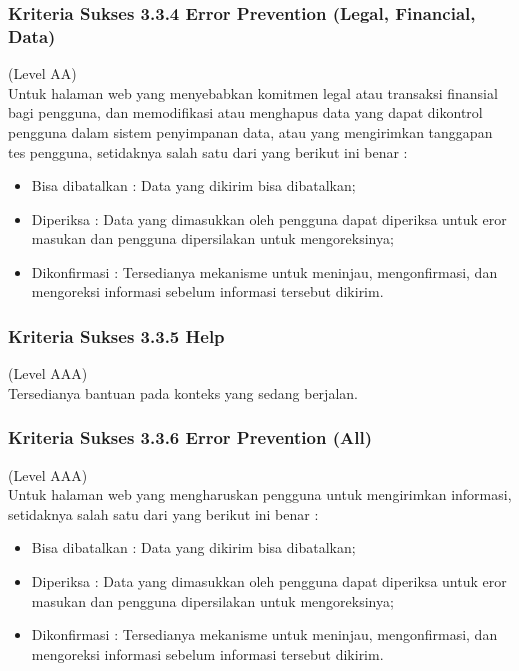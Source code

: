 \subsubsection{Kriteria Sukses 3.3.4 Error Prevention (Legal, Financial, Data)}
\label{subsubsec:kriteria_3.3.4}
(Level AA) \\

Untuk halaman web yang menyebabkan komitmen legal atau transaksi finansial bagi pengguna, dan memodifikasi atau menghapus data yang dapat dikontrol pengguna dalam sistem penyimpanan data, atau yang mengirimkan tanggapan tes pengguna, setidaknya salah satu dari yang berikut ini benar :

\begin{itemize}
	\item Bisa dibatalkan : Data yang dikirim bisa dibatalkan;
	\item Diperiksa : Data yang dimasukkan oleh pengguna dapat diperiksa untuk eror masukan dan pengguna dipersilakan untuk mengoreksinya;
	\item Dikonfirmasi : Tersedianya mekanisme untuk meninjau, mengonfirmasi, dan mengoreksi informasi sebelum informasi tersebut dikirim.
\end{itemize}


\subsubsection{Kriteria Sukses 3.3.5 Help}
\label{subsubsec:kriteria_3.3.5}
(Level AAA) \\

Tersedianya bantuan pada konteks yang sedang berjalan.


\subsubsection{Kriteria Sukses 3.3.6 Error Prevention (All)}
\label{subsubsec:kriteria_3.3.6}
(Level AAA) \\

Untuk halaman web yang mengharuskan pengguna untuk mengirimkan informasi, setidaknya salah satu dari yang berikut ini benar :

\begin{itemize}
	\item Bisa dibatalkan : Data yang dikirim bisa dibatalkan;
	\item Diperiksa : Data yang dimasukkan oleh pengguna dapat diperiksa untuk eror masukan dan pengguna dipersilakan untuk mengoreksinya;
	\item Dikonfirmasi : Tersedianya mekanisme untuk meninjau, mengonfirmasi, dan mengoreksi informasi sebelum informasi tersebut dikirim.
\end{itemize}

